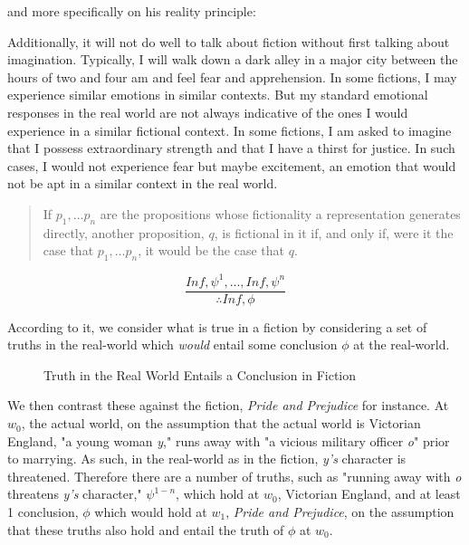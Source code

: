 \documentclass[phdthesis,12pt,final]{wuthesis}
\theoremstyle{definition}
\theoremstyle{definition}
\theoremstyle{definition}
\theoremstyle{definition}
\theoremstyle{remark}
\begin{document}
and more specifically on his reality principle:

Additionally, it will not do well to talk about fiction without first talking about imagination. Typically, I will walk down a dark alley in a major city between the hours of two and four am and feel fear and apprehension. In some fictions, I may experience similar emotions in similar contexts. But my standard emotional responses in the real world are not always indicative of the ones I would experience in a similar fictional context. In some fictions, I am asked to imagine that I possess extraordinary strength and that I have a thirst for justice. In such cases, I would not experience fear but maybe excitement, an emotion that would not be apt in a similar context in the real world.

\begin{quote}
If \(p_{1}, . . . p_{n}\) are the propositions whose fictionality a representation generates directly, another proposition, \(q\), is fictional in it if, and only if, were it the case that \(p_{1}, . . . p_{n}\), it would be the case that \(q\).
\end{quote}

\[\frac{In f, \psi^{1}, . . ., In f, \psi^{n}}{\therefore In f, \phi}\]

According to it, we consider what is true in a fiction by considering a set of truths in the real-world which \emph{would} entail some conclusion \(\phi\) at the real-world.

\begin{figure}
\centering
\caption{Truth in the Real World Entails a Conclusion in Fiction}
\label{fig:truth-fiction}
\end{figure}

We then contrast these against the fiction, \emph{Pride and Prejudice} for instance. At \(w_{0}\), the actual world, on the assumption that the actual world is Victorian England, "a young woman \emph{y}," runs away with "a vicious military officer \emph{o}" prior to marrying. As such, in the real-world as in the fiction, \emph{y's} character is threatened. Therefore there are a number of truths, such as "running away with \emph{o} threatens \emph{y's} character," \(\psi^{1-n}\), which hold at \(w_{0}\), Victorian England, and at least 1 conclusion, \(\phi\) which would hold at \(w_{1}\), \emph{Pride and Prejudice}, on the assumption that these truths also hold and entail the truth of \(\phi\) at \(w_{0}\).
\end{document}
